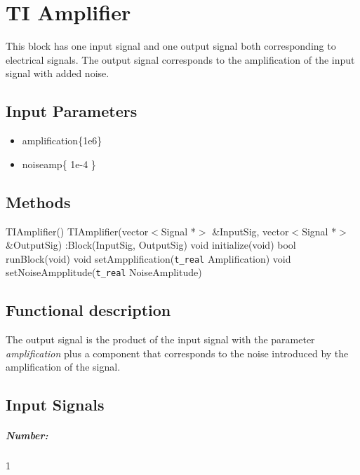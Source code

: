 \clearpage

\section{TI Amplifier}

\maketitle

This block has one input signal and one output signal both corresponding to electrical signals. The output signal corresponds to the amplification of the input signal with added noise.


\subsection*{Input Parameters}

\begin{itemize}
	\item amplification\{1e6\}
	\item noiseamp\{ 1e-4 \}
\end{itemize}

\subsection*{Methods}
 
TIAmplifier() {}
\bigbreak
TIAmplifier(vector$<$Signal *$>$ \&InputSig, vector$<$Signal *$>$ \&OutputSig) :Block(InputSig, OutputSig) {}
\bigbreak
void initialize(void)
\bigbreak
bool runBlock(void)
\bigbreak
void setAmpplification(\texttt{t\_real} Amplification)
\bigbreak
void setNoiseAmpplitude(\texttt{t\_real} NoiseAmplitude)

\subsection*{Functional description}

The output signal is the product of the input signal with the parameter \textit{amplification} plus a component that corresponds to the noise introduced by the amplification of the signal. 

\pagebreak

\subsection*{Input Signals}

\subparagraph*{Number:} 1

